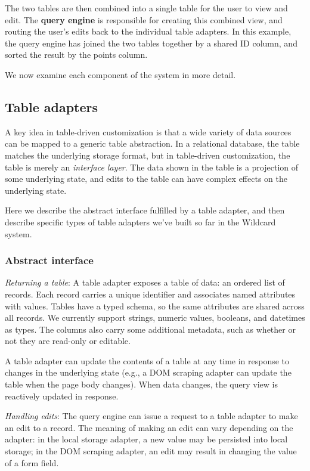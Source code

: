 \documentclass[sigplan,screen,10pt,anonymous,review]{acmart}
\begin{document}
The two tables are then combined into a single table for the user to
view and edit. The \textbf{query engine} is responsible for creating
this combined view, and routing the user's edits back to the individual
table adapters. In this example, the query engine has joined the two
tables together by a shared ID column, and sorted the result by the
points column.

We now examine each component of the system in more detail.

\hypertarget{table-adapters}{%
\subsection{Table adapters}\label{table-adapters}}

A key idea in table-driven customization is that a wide variety of data
sources can be mapped to a generic table abstraction. In a relational
database, the table matches the underlying storage format, but in
table-driven customization, the table is merely an \emph{interface
layer}. The data shown in the table is a projection of some underlying
state, and edits to the table can have complex effects on the underlying
state.

Here we describe the abstract interface fulfilled by a table adapter,
and then describe specific types of table adapters we've built so far in
the Wildcard system.

\hypertarget{abstract-interface}{%
\subsubsection{Abstract interface}\label{abstract-interface}}

\emph{Returning a table}: A table adapter exposes a table of data: an
ordered list of records. Each record carries a unique identifier and
associates named attributes with values. Tables have a typed schema, so
the same attributes are shared across all records. We currently support
strings, numeric values, booleans, and datetimes as types. The columns
also carry some additional metadata, such as whether or not they are
read-only or editable.

A table adapter can update the contents of a table at any time in
response to changes in the underlying state (e.g., a DOM scraping
adapter can update the table when the page body changes). When data
changes, the query view is reactively updated in response.

\emph{Handling edits}: The query engine can issue a request to a table
adapter to make an edit to a record. The meaning of making an edit can
vary depending on the adapter: in the local storage adapter, a new value
may be persisted into local storage; in the DOM scraping adapter, an
edit may result in changing the value of a form field.
\end{document}

